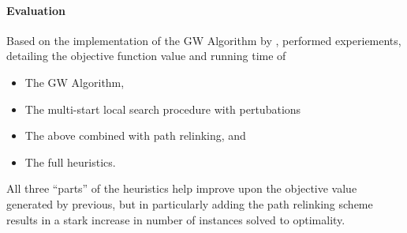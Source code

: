 \paragraph{Evaluation}
Based on the implementation of the GW Algorithm by \cite{Johnson:2000:PCS:338219.338637},
\cite{canuto2001local} performed experiements, detailing the objective function value
and running time of
\begin{itemize}
\item The GW Algorithm,
\item The multi-start local search procedure with pertubations
\item The above combined with path relinking, and
\item The full heuristics.
\end{itemize}

All three ``parts'' of the heuristics help improve upon the
objective value generated by previous, but in particularly adding the
path relinking scheme results in a stark increase
 in number of instances solved to optimality.



